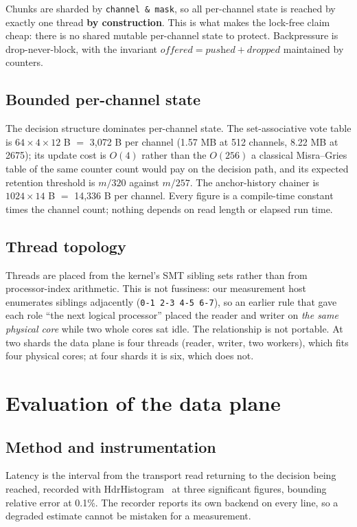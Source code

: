 \documentclass[sigconf,nonacm]{acmart}
\begin{document}
Chunks are sharded by \texttt{channel \& mask}, so all per-channel state is reached by exactly
one thread \textbf{by construction}. This is what makes the lock-free claim cheap: there is no
shared mutable per-channel state to protect. Backpressure is drop-never-block, with the
invariant $\textit{offered} = \textit{pushed} + \textit{dropped}$ maintained by counters.

\subsection{Bounded per-channel state}

The decision structure dominates per-channel state. The set-associative vote table is
$64 \times 4 \times 12$ B $=$ 3,072 B per channel (1.57 MB at 512 channels, 8.22 MB at 2675);
its update cost is $O(4)$ rather than the $O(256)$ a classical Misra--Gries table of the same
counter count would pay on the decision path, and its expected retention threshold is $m/320$
against $m/257$. The anchor-history chainer is $1024 \times 14$ B $=$ 14,336 B per channel.
Every figure is a compile-time constant times the channel count; nothing depends on read length
or elapsed run time.

\subsection{Thread topology}

Threads are placed from the kernel's SMT sibling sets rather than from processor-index
arithmetic. This is not fussiness: our measurement host enumerates siblings adjacently
(\texttt{0-1 2-3 4-5 6-7}), so an earlier rule that gave each role ``the next logical
processor'' placed the reader and writer on \emph{the same physical core} while two whole cores
sat idle. The relationship is not portable. At two shards the data plane is four threads
(reader, writer, two workers), which fits four physical cores; at four shards it is six, which
does not.

\section{Evaluation of the data plane}
\label{sec:eval}

\subsection{Method and instrumentation}

Latency is the interval from the transport read returning to the decision being reached,
recorded with HdrHistogram~\cite{hdrhistogram} at three significant figures, bounding relative
error at 0.1\%. The recorder reports its own backend on every line, so a degraded estimate
cannot be mistaken for a measurement.
\end{document}
